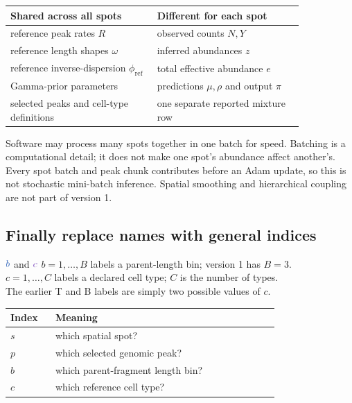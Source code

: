 \documentclass[11pt]{article}
\newcommand{\fixedq}[1]{\textcolor{fixedblue!75!black}{#1}}
\newcommand{\unknownq}[1]{\textcolor{unknownpurple}{#1}}
\begin{document}
\begin{center}
\begin{tabular}{L{0.42\linewidth}L{0.42\linewidth}}
\toprule
Shared across all spots & Different for each spot \\
\midrule
reference peak rates \(R\) & observed counts \(N,Y\) \\
reference length shapes \(\omega\) & inferred abundances \(z\) \\
reference inverse-dispersion \(\phi_{\mathrm{ref}}\) & total effective abundance \(e\) \\
Gamma-prior parameters & predictions \(\mu,\rho\) and output \(\pi\) \\
selected peaks and cell-type definitions & one separate reported mixture row \\
\bottomrule
\end{tabular}
\end{center}

\begin{watchout}
Software may process many spots together in one batch for speed. Batching is a
computational detail; it does not make one spot's abundance affect another's.
Every spot batch and peak chunk contributes before an Adam update, so this is
not stochastic mini-batch inference. Spatial smoothing and hierarchical
coupling are not part of version 1.
\end{watchout}

\subsection{Finally replace names with general indices}

\begin{newvar}{\(\fixedq{b}\) and \(\unknownq{c}\)}
\(b=1,\ldots,B\) labels a parent-length bin; version 1 has \(B=3\).\\
\(c=1,\ldots,C\) labels a declared cell type; \(C\) is the number of types.\\
The earlier T and B labels are simply two possible values of \(c\).
\end{newvar}

\begin{center}
\begin{tabular}{C{0.11\linewidth}L{0.66\linewidth}}
\toprule
Index & Meaning \\
\midrule
\(s\) & which spatial spot? \\
\(p\) & which selected genomic peak? \\
\(b\) & which parent-fragment length bin? \\
\(c\) & which reference cell type? \\
\bottomrule
\end{tabular}
\end{center}
\end{document}
